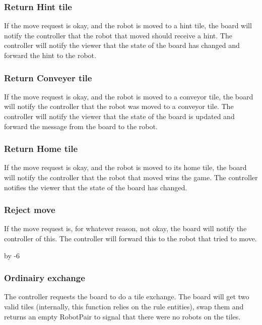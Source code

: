 	

	\subsubsection{Return Hint tile}
	If the move request is okay, and the robot is moved to a hint tile, the board will notify the controller that the robot that moved should receive a hint. The controller will notify the viewer that the state of the board has changed and forward the hint to the robot.

	

	\subsubsection{Return Conveyer tile}
	If the move request is okay, and the robot is moved to a conveyor tile, the board will notify the controller that the robot was moved to a conveyor tile. The controller will notify the viewer that the state of the board is updated and forward the message from the board to the robot.

	

	\subsubsection{Return Home tile}
	If the move request is okay, and the robot is moved to its home tile, the board will notify the controller that the robot that moved wins the game. The controller notifies the viewer that the state of the board has changed.

	


	\subsubsection{Reject move}
	If the move request is, for whatever reason, not okay, the board will notify the controller of this. The controller will forward this to the robot that tried to move.

	


	\advance{} by -6

	\subsubsection{Ordinairy exchange}
	The controller requests the board to do a tile exchange. The board will get two valid tiles (internally, this function relies on the rule entities), swap them and returns an empty RobotPair to signal that there were no robots on the tiles.

